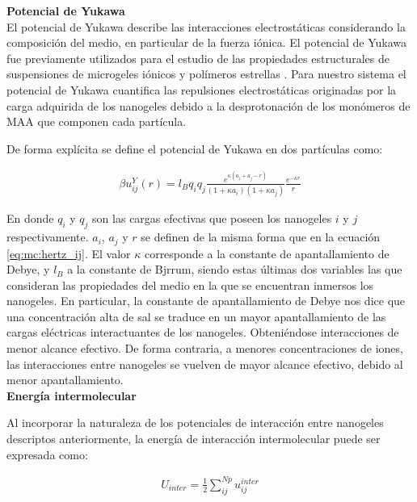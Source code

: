 	
	\textbf{Potencial de Yukawa} \\
	
	El potencial de Yukawa describe las interacciones electrost\'aticas considerando la composici\'on del medio, en particular de la fuerza i\'onica.
	El potencial de Yukawa fue previamente utilizados para el estudio de las propiedades estructurales de suspensiones de microgeles i\'onicos \citet{weyer2018concentration} y  pol\'imeros estrellas \cite{denton2003counterion}. Para nuestro sistema el potencial de Yukawa cuantifica las repulsiones electrost\'aticas originadas por la carga adquirida de los nanogeles debido a la desprotonaci\'on  de los mon\'omeros de MAA que componen cada part\'icula.

	
	De forma expl\'icita se define el potencial de Yukawa en dos part\'iculas como: 
	
	\begin{align}
		\beta u^Y_{ij}(r) = l_Bq_i q_j \frac{e^{\kappa(a_i + a_j -r)}}{(1 +\kappa a_i)(1 + \kappa a_j)} \frac{e^{-\kappa r}}{r} 
		\label{eq:mc:yukawa}
	\end{align}
	
	\noindent En donde $q_i$ y $q_j$ son las cargas efectivas que poseen los nanogeles $i$ y $j$ respectivamente. $a_i$, $a_j$ y $r$ se definen de la misma forma que en la ecuaci\'on \ref{eq:mc:hertz_ij}. El valor $\kappa$ corresponde a la constante de apantallamiento de Debye, y $l_B$ a la constante de Bjrrum, siendo estas \'ultimas dos variables las que consideran las propiedades del medio en la que se encuentran inmersos los nanogeles. 
	En particular, la constante de apantallamiento de Debye nos dice que una concentraci\'on alta de sal se traduce en un mayor apantallamiento de las cargas el\'ectricas interactuantes de los nanogeles.  Obteni\'endose interacciones de menor alcance efectivo.
	De forma contraria, a menores concentraciones de iones, las interacciones entre nanogeles se vuelven de mayor alcance efectivo, debido al menor apantallamiento.\\
	
	\textbf{Energ\'ia intermolecular}
	
	Al incorporar la naturaleza de los potenciales de interacci\'on entre nanogeles descriptos anteriormente, la energ\'ia de interacci\'on intermolecular puede ser expresada como:
	
	\begin{align}
		U_{inter} = \frac{1}{2}\sum_{i j}^{Np}{u^{inter}_{ij}}
	\end{align}

